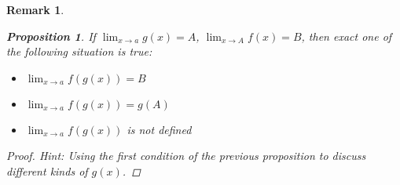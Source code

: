 \documentclass[onecolumn]{ctexart}
\newtheorem{proposition}{Proposition}
\newtheorem{remark}{Remark}
\begin{document}
\begin{remark}
  \begin{proposition}
    If $\lim_{x \to a} g(x) = A$, $\lim_{x \to A} f(x) = B$, then exact one of 
    the following situation is true:
    \begin{itemize}
      \item $\lim_{x \to a} f(g(x)) = B$
      \item $\lim_{x \to a} f(g(x)) = g(A)$
      \item $\lim_{x \to a} f(g(x))$ is not defined
    \end{itemize}
  \end{proposition}
  \begin{proof}
    Hint: Using the first condition of the previous proposition to discuss 
    different kinds of $g(x)$.
  \end{proof}
\end{remark}
\end{document}
